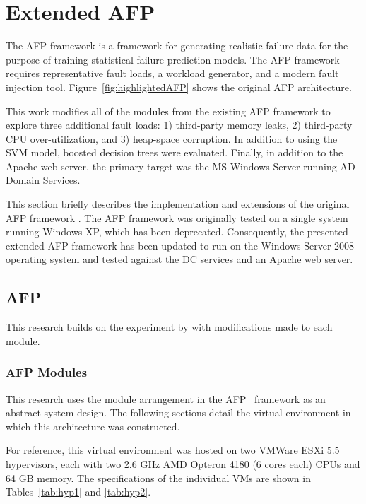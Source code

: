 \section{Extended \acrfull{AFP}} \label{chapter3} 
The \ac{AFP} framework is a framework for generating realistic failure data for
the purpose of training statistical failure prediction models.  The \ac{AFP}
framework requires representative fault loads, a workload generator, and a
modern fault injection tool.  Figure~\ref{fig:highlightedAFP} shows the
original \ac{AFP} architecture.

This work modifies all of the modules from the existing \ac{AFP} framework to
explore three additional fault loads: 1) third-party memory leaks, 2)
third-party \ac{CPU} over-utilization, and 3) heap-space corruption.  In
addition to using the \ac{SVM} model, boosted decision trees were evaluated.
Finally, in addition to the Apache web server, the primary target was the
\ac{MS} Windows Server running \ac{AD} Domain Services.

This section briefly describes the implementation and extensions of the
original \ac{AFP} framework \citep{irrera2015}.  The \ac{AFP} framework was
originally tested on a single system running Windows XP, which has been
deprecated.  Consequently, the presented extended \ac{AFP} framework has been
updated to run on the Windows Server 2008 operating system and tested against
the \ac{DC} services and an Apache web server.

\subsection{\acrfull{AFP}} \label{sec:implementation} This research builds on
the experiment by \citet{irrera2015} with modifications made to each module.

\subsubsection{\acrfull{AFP} Modules}
This research uses the module arrangement in the \ac{AFP}~\citep{irrera2015}
framework as an abstract system design.  The following sections detail the
virtual environment in which this architecture was constructed.


For reference, this virtual environment was hosted on two VMWare ESXi 5.5
hypervisors, each with two 2.6 \ac{GHz} AMD Opteron 4180 (6 cores each)
\ac{CPU}s and 64 \ac{GB} memory.  The specifications of the individual \ac{VM}s
are shown in Tables~\ref{tab:hyp1} and \ref{tab:hyp2}.

